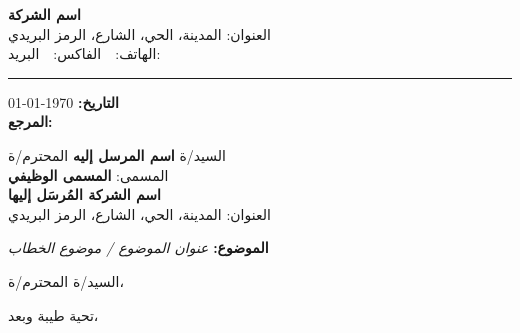 \documentclass[12pt,a4paper]{article}
\begin{document}
\begin{center}
{\LARGE\bfseries اسم الشركة}\\[0.3em]
{\small العنوان: المدينة، الحي، الشارع، الرمز البريدي}\\[0.2em]
{\small الهاتف:  \,\textbar\, الفاكس:  \,\textbar\, البريد: }
\end{center}

\vspace{0.5em}
\hrule
\vspace{1.5em}

\begin{flushright}
\textbf{التاريخ:} \today\\[0.2em]
\textbf{المرجع:} 
\end{flushright}

\vspace{1em}

\begin{flushright}
السيد/ة \textbf{اسم المرسل إليه} المحترم/ة\\[0.2em]
المسمى: \textbf{المسمى الوظيفي}\\[0.2em]
\textbf{اسم الشركة المُرسَل إليها}\\[0.2em]
العنوان: المدينة، الحي، الشارع، الرمز البريدي
\end{flushright}

\vspace{1em}

\begin{flushright}
\textbf{الموضوع:} \textit{عنوان الموضوع / موضوع الخطاب}
\end{flushright}

\vspace{0.5em}

\begin{flushright}
السيد/ة المحترم/ة،
\end{flushright}

\vspace{0.5em}

تحية طيبة وبعد،
\end{document}
